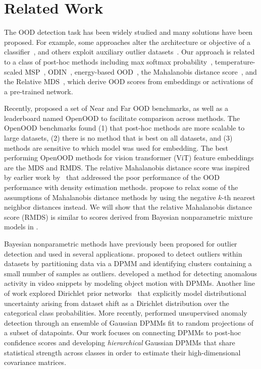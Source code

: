 \section{Related Work}
\label{sec:relatedwork}
The OOD detection task has been widely studied and many solutions have been proposed.
For example, some approaches alter the architecture or objective of a classifier~\citep{TackJ20,HuangR21,wei2022mitigating,linderman23}, and others exploit auxiliary outlier datasets~\citep{HendrycksD19,zhang2021mixture}.
Our approach is related to a class of post-hoc methods including max softmax probability~\citep[MSP;][]{HendrycksD17}, temperature-scaled MSP~\citep{guo17tempscale}, ODIN~\citep{LiangS18}, energy-based OOD~\cite{LiuW20}, the Mahalanobis distance score~\citep[MDS;][]{lee18mds}, and the Relative MDS~\citep{ren21rmds}, which derive OOD scores from embeddings or activations of a pre-trained network.

Recently, \citet{zhang23openood15} proposed a set of Near and Far OOD benchmarks, as well as a leaderboard named OpenOOD to facilitate comparison across methods. The OpenOOD benchmarks found (1) that post-hoc methods are more scalable to large datasets, (2) there is no method that is best on all datasets, and (3) methods are sensitive to which model was used for embedding.
The best performing OpenOOD methods for vision transformer (ViT) feature embeddings are the MDS and RMDS.
The relative Mahalanobis distance score was inspired by earlier work by~\citet{ren2019likelihood} that addressed the poor performance of the OOD performance with density estimation methods.
\citet{sun2022out} propose to relax some of the assumptions of Mahalanobis distance methods by using the negative $k$-th nearest neighbor distances instead.
We will show that the relative Mahalanobis distance score (RMDS) is similar to scores derived from Bayesian nonparametric mixture models in .

Bayesian nonparametric methods have previously been proposed for outlier detection and used in several applications. \citet{shotwell2011} proposed to detect outliers within datasets by partitioning data via a DPMM and identifying clusters containing a small number of samples as outliers.
\citet{varadarajan17} developed a method for detecting anomalous activity in video snippets by modeling object motion with DPMMs. Another line of work explored Dirichlet prior networks~\citep[DPN;][]{malinin2018predictive,malinin2019reverse} that explicitly model distributional uncertainty arising from dataset shift as a Dirichlet distribution over the categorical class probabilities.
More recently, \citet{Kim2024UnsupervisedOD} performed unsupervised anomaly detection through an ensemble of Gaussian DPMMs fit to random projections of a subset of datapoints.
Our work focuses on connecting DPMMs to post-hoc confidence scores and developing \textit{hierarchical} Gaussian DPMMs that share statistical strength across classes in order to estimate their high-dimensional covariance matrices.